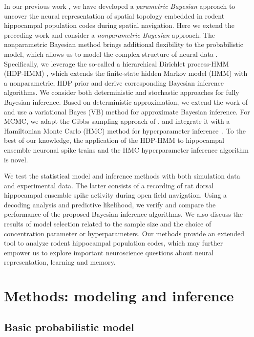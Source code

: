 In our previous work \citep{Chen12a,Chen14}, we have developed a {\em
  parametric Bayesian} approach to uncover the neural representation
of spatial topology embedded in rodent hippocampal population codes
during spatial navigation.  Here we extend the preceding work and
consider a {\em nonparametric Bayesian} approach.  The nonparametric
Bayesian method brings additional flexibility to the probabilistic
model, which allows us to model the complex structure of neural data
\citep{Teh10,Wood08,Shalchyan14}.  Specifically, we leverage the
so-called a hierarchical Dirichlet process-HMM (HDP-HMM)
\citep{Teh06}, which extends the finite-state hidden Markov model
(HMM) with a nonparametric, HDP prior and derive corresponding
Bayesian inference algorithms.  We consider both deterministic and
stochastic approaches for fully Bayesian inference.  Based on
deterministic approximation, we extend the work of
\citep{Chen12a,Johnson14} and use a variational Bayes (VB) method for
approximate Bayesian inference.  For MCMC, we adapt the Gibbs sampling
approach of \citep{Teh06}, and integrate it with a Hamiltonian Monte
Carlo (HMC) method for hyperparameter inference~\citep{Neal10}.  To
the best of our knowledge, the application of the HDP-HMM to
hippocampal ensemble neuronal spike trains and the HMC hyperparameter
inference algorithm is novel.

 
We test the statistical model and inference methods with both
simulation data and experimental data. The latter consists of a
recording of rat dorsal hippocampal ensemble spike activity during
open field navigation. Using a decoding analysis and predictive
likelihood, we verify and compare the performance of the proposed
Bayesian inference algorithms. We also discuss the results of model
selection related to the sample size and the choice of concentration
parameter or hyperparameters. Our methods provide an extended tool to
analyze rodent hippocampal population codes, which may further empower
us to explore important neuroscience questions about neural
representation, learning and memory.
 

\section{Methods: modeling and inference}

\subsection{Basic probabilistic model} 


